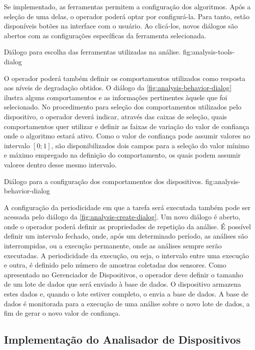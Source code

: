 Se implementado, as ferramentas permitem a configuração dos algoritmos. Após a seleção de uma delas,
o operador poderá optar por configurá-la. Para tanto, estão disponíveis botões na interface com o
usuário. Ao clicá-los, novos diálogos são abertos com as configurações específicas da ferramenta
selecionada.

  {Diálogo para escolha das ferramentas utilizadas na análise.}
  {fig:analysis-tools-dialog}

O operador poderá também definir os comportamentos utilizados como resposta aos níveis de degradação
obtidos. O diálogo da \cref{fig:analysis-behavior-dialog} ilustra alguns comportamentos e as
informações pertinentes àquele que foi selecionado. No procedimento para seleção dos comportamentos
utilizados pelo dispositivo, o operador deverá indicar, através das caixas de seleção, quais
comportamentos quer utilizar e definir as faixas de variação do valor de confiança onde o algoritmo
estará ativo. Como o valor de confiança pode assumir valores no intervalo ${[0; 1]}$, são
disponibilizados dois campos para a seleção do valor mínimo e máximo empregado na definição do
comportamento, os quais podem assumir valores dentro desse mesmo intervalo.

  {Diálogo para a configuração dos comportamentos dos dispositivos.}
  {fig:analysis-behavior-dialog}

A configuração da periodicidade em que a tarefa será executada também pode ser acessada pelo diálogo
da \cref{fig:analysis-create-dialog}. Um novo diálogo é aberto, onde o operador poderá definir as
propriedades de repetição da análise. É possível definir um intervalo fechado, onde, após um
determinado período, as análises são interrompidas, ou a execução permanente, onde as análises
sempre serão executadas. A periodicidade da execução, ou seja, o intervalo entre uma execução e
outra, é definido pelo número de amostras coletadas dos sensores. Como apresentado no Gerenciador de
Dispositivos, o operador deve definir o tamanho de um lote de dados que será enviado à base de
dados. O dispositivo armazena estes dados e, quando o lote estiver completo, o envia a base de
dados. A base de dados é monitorada para a execução de uma análise sobre o novo lote de dados, a fim
de gerar o novo valor de confiança.


\subsection{Implementação do Analisador de Dispositivos}

